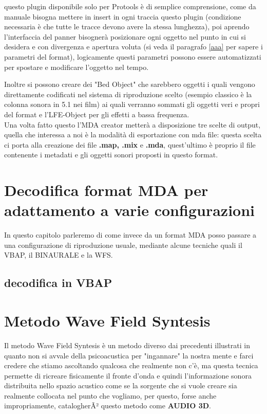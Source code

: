 \documentclass[12pt,a4paper]{report}
\begin{document}
questo plugin disponibile solo per Protools è di semplice comprensione, come da manuale bisogna mettere in insert in ogni traccia questo plugin (condizione necessaria è che tutte le tracce devono avere la stessa lunghezza), poi aprendo l'interfaccia del panner bisognerà posizionare ogni oggetto nel punto in cui si desidera e con divergenza e apertura voluta (si veda il paragrafo \ref{aaa} per sapere i parametri del format), logicamente questi parametri possono essere automatizzati per spostare e modificare l'oggetto nel tempo.

Inoltre si possono creare dei "Bed Object" che sarebbero oggetti i quali vengono direttamente codificati nel sistema di riproduzione scelto (esempio classico è la colonna sonora in 5.1 nei film) ai quali verranno sommati gli oggetti veri e propri del format e l'LFE-Object per gli effetti a bassa frequenza.\\

Una volta fatto questo l'MDA creator metterà a disposizione tre scelte di output, quella che interessa a noi è la modalità di esportazione con mda file: questa scelta ci porta alla creazione dei file \textbf{.map, .mix} e \textbf{.mda}, quest'ultimo è proprio il file contenente i metadati e gli oggetti sonori proposti in questo format.


\chapter{Decodifica format MDA per adattamento a varie configurazioni}

In questo capitolo parleremo di come invece da un format MDA posso passare a una configurazione di riproduzione usuale, mediante alcune tecniche quali il VBAP, il BINAURALE e la WFS.\\

\section{decodifica in VBAP}








\chapter{Metodo Wave Field Syntesis}

Il metodo Wave Field Syntesis è un metodo diverso dai precedenti illustrati in quanto non si avvale della psicoacustica per "ingannare" la nostra mente e farci credere che stiamo ascoltando qualcosa che realmente non c'è, ma questa tecnica permette di ricreare fisicamente il fronte d'onda e quindi l'informazione sonora distribuita nello spazio acustico come se la sorgente che si vuole creare sia realmente collocata nel punto che vogliamo, per questo, forse anche impropriamente, catalogherÃ² questo metodo come \textbf{AUDIO 3D}.\\
\end{document}
